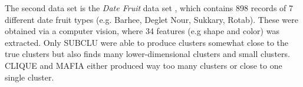 The second data set is the \textit{Date Fruit} data set \cite{date-fruit}, which contains 898 records of 7 different date fruit types (e.g. Barhee, Deglet Nour, Sukkary, Rotab). These were obtained via a computer vision, where 34 features (e.g shape and color) was extracted. Only SUBCLU were able to produce clusters somewhat close to the true clusters but also finds many lower-dimensional clusters and small clusters. CLIQUE and MAFIA either produced way too many clusters or close to one single cluster.
